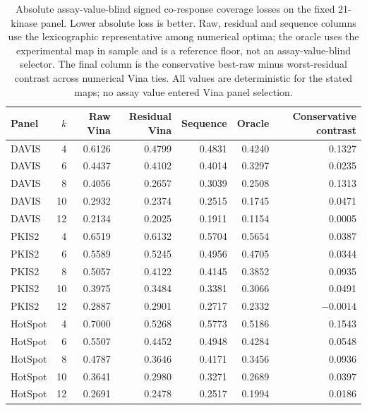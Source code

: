 \documentclass[11pt]{article}
\begin{document}
\begin{table}[htbp]
\centering
\caption{Absolute assay-value-blind signed co-response coverage losses on the
fixed 21-kinase panel. Lower absolute loss is better. Raw, residual and sequence
columns use the lexicographic representative among numerical optima; the oracle
uses the experimental map in sample and is a reference floor, not an
assay-value-blind selector. The final column is the conservative best-raw minus
worst-residual contrast across numerical Vina ties. All values are deterministic
for the stated maps; no assay value entered Vina panel selection.}
\label{tab:s5transfer}
\small
\begin{tabular}{lrrrrrr}
\toprule
Panel & $k$ & Raw Vina & Residual Vina & Sequence & Oracle &
Conservative contrast \\
\midrule
DAVIS & 4 & 0.6126 & 0.4799 & 0.4831 & 0.4240 & 0.1327 \\
DAVIS & 6 & 0.4437 & 0.4102 & 0.4014 & 0.3297 & 0.0235 \\
DAVIS & 8 & 0.4056 & 0.2657 & 0.3039 & 0.2508 & 0.1313 \\
DAVIS & 10 & 0.2932 & 0.2374 & 0.2515 & 0.1745 & 0.0471 \\
DAVIS & 12 & 0.2134 & 0.2025 & 0.1911 & 0.1154 & 0.0005 \\
\addlinespace
PKIS2 & 4 & 0.6519 & 0.6132 & 0.5704 & 0.5654 & 0.0387 \\
PKIS2 & 6 & 0.5589 & 0.5245 & 0.4956 & 0.4705 & 0.0344 \\
PKIS2 & 8 & 0.5057 & 0.4122 & 0.4145 & 0.3852 & 0.0935 \\
PKIS2 & 10 & 0.3975 & 0.3484 & 0.3381 & 0.3066 & 0.0491 \\
PKIS2 & 12 & 0.2887 & 0.2901 & 0.2717 & 0.2332 & $-0.0014$ \\
\addlinespace
HotSpot & 4 & 0.7000 & 0.5268 & 0.5773 & 0.5186 & 0.1543 \\
HotSpot & 6 & 0.5507 & 0.4452 & 0.4948 & 0.4284 & 0.0548 \\
HotSpot & 8 & 0.4787 & 0.3646 & 0.4171 & 0.3456 & 0.0936 \\
HotSpot & 10 & 0.3641 & 0.2980 & 0.3271 & 0.2689 & 0.0397 \\
HotSpot & 12 & 0.2691 & 0.2478 & 0.2517 & 0.1994 & 0.0186 \\
\bottomrule
\end{tabular}
\end{table}
\end{document}
